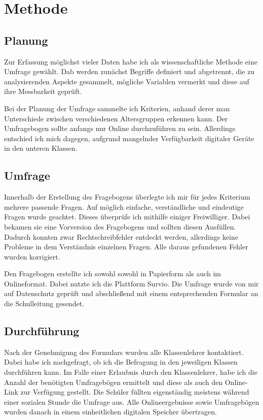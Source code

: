 \section{Methode}

\subsection{Planung}

Zur Erfassung möglichst vieler Daten habe ich als wissenschaftliche Methode eine Umfrage gewählt. Dab werden zunächst Begriffe definiert und abgetrennt, die zu analysierenden Aspekte gesammelt, mögliche Variablen vermerkt und diese auf ihre Messbarkeit geprüft\cite{Konzeption}.

Bei der Planung der Umfrage sammelte ich Kriterien, anhand derer man Unterschiede zwischen verschiedenen Altersgruppen erkennen kann. Der Umfragebogen sollte anfangs nur Online durchzuführen zu sein. Allerdings entschied ich mich dagegen, aufgrund mangelnder Verfügbarkeit digitaler Geräte in den unteren Klassen.

\subsection{Umfrage}

Innerhalb der Erstellung des Fragebogens überlegte ich mir für jedes Kriterium mehrere passende Fragen. Auf möglich einfache, verständliche und eindeutige Fragen wurde geachtet. Dieses überprüfe ich mithilfe einiger Freiwilliger. Dabei bekamen sie eine Vorversion des Fragebogens und sollten diesen Ausfüllen. Dadurch konnten zwar Rechtschreibfehler entdeckt werden, allerdings keine Probleme in dem Verständnis einzelnen Fragen. Alle daraus gefundenen Fehler wurden korrigiert.

Den Fragebogen erstellte ich sowohl sowohl in Papierform als auch im Onlineformat. Dabei nutzte ich die Plattform Survio. Die Umfrage wurde von mir auf Datenschutz geprüft und abschließend mit einem entsprechenden Formular an die Schulleitung gesendet.

\subsection{Durchführung}

Nach der Genehmigung des Formulars wurden alle Klassenlehrer kontaktiert. Dabei habe ich nachgefragt, ob ich die Befragung in den jeweiligen Klassen durchführen kann. Im Falle einer Erlaubnis durch den Klassenlehrer, habe ich  die Anzahl der benötigten Umfragebögen ermittelt und diese als auch den Online-Link zur Verfügung gestellt. Die Schüler füllten eigenständig meistens während einer sozialen Stunde die Umfrage aus. Alle Onlineergebnisse sowie Umfragebögen wurden danach in einem einheitlichen digitalen Speicher übertragen.